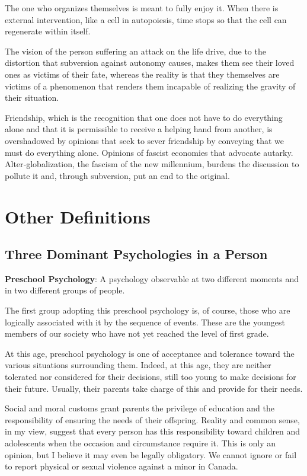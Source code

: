 \documentclass[12pt,oneside]{article}
\begin{document}
The one who organizes themselves is meant to fully enjoy it. When there is external intervention, like a cell in autopoiesis, time stops so that the cell can regenerate within itself.

The vision of the person suffering an attack on the life drive, due to the distortion that subversion against autonomy causes, makes them see their loved ones as victims of their fate, whereas the reality is that they themselves are victims of a phenomenon that renders them incapable of realizing the gravity of their situation.

Friendship, which is the recognition that one does not have to do everything alone and that it is permissible to receive a helping hand from another, is overshadowed by opinions that seek to sever friendship by conveying that we must do everything alone. Opinions of fascist economies that advocate autarky. Alter‑globalization, the fascism of the new millennium, burdens the discussion to pollute it and, through subversion, put an end to the original.

\section*{Other Definitions}

\subsection*{Three Dominant Psychologies in a Person}

\textbf{Preschool Psychology}: A psychology observable at two different moments and in two different groups of people.

The first group adopting this preschool psychology is, of course, those who are logically associated with it by the sequence of events. These are the youngest members of our society who have not yet reached the level of first grade.

At this age, preschool psychology is one of acceptance and tolerance toward the various situations surrounding them. Indeed, at this age, they are neither tolerated nor considered for their decisions, still too young to make decisions for their future. Usually, their parents take charge of this and provide for their needs.

Social and moral customs grant parents the privilege of education and the responsibility of ensuring the needs of their offspring. Reality and common sense, in my view, suggest that every person has this responsibility toward children and adolescents when the occasion and circumstance require it. This is only an opinion, but I believe it may even be legally obligatory. We cannot ignore or fail to report physical or sexual violence against a minor in Canada.
\end{document}
